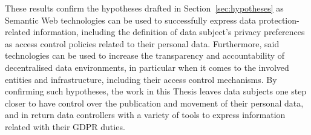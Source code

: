 These results confirm the hypotheses drafted in Section~\ref{sec:hypotheses} as Semantic Web technologies can be used to successfully express data protection-related information, including the definition of data subject's privacy preferences as access control policies related to their personal data.
Furthermore, said technologies can be used to increase the transparency and accountability of decentralised data environments, in particular when it comes to the involved entities and infrastructure, including their access control mechanisms. 
By confirming such hypotheses, the work in this Thesis leaves data subjects one step closer to have control over the publication and movement of their personal data, and in return data controllers with a variety of tools to express information related with their GDPR duties.